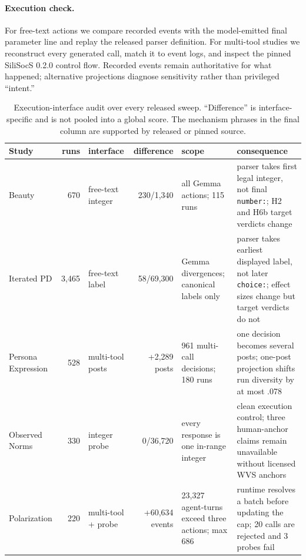 \documentclass[9pt,twocolumn]{extarticle}
\begin{document}
\paragraph{Execution check.}
For free-text actions we compare recorded events with the model-emitted final parameter line and replay the released parser definition. For multi-tool studies we reconstruct every generated call, match it to event logs, and inspect the pinned SiliSocS 0.2.0 control flow. Recorded events remain authoritative for what happened; alternative projections diagnose sensitivity rather than privileged ``intent.''

\begin{table}[t]
\centering
\scriptsize
\caption{Execution-interface audit over every released sweep. ``Difference'' is interface-specific and is not pooled into a global score. The mechanism phrases in the final column are supported by released or pinned source.}
\label{tab:interfaces}
\begin{tabular}{@{}lrlr p{3.45cm} p{5.45cm}@{}}
\toprule
Study & runs & interface & difference & scope & consequence \\
\midrule
Beauty & 670 & free-text integer & 230/1,340 & all Gemma actions; 115 runs & parser takes first legal integer, not final \texttt{number:}; H2 and H6b target verdicts change \\
Iterated PD & 3,465 & free-text label & 58/69,300 & Gemma divergences; canonical labels only & parser takes earliest displayed label, not later \texttt{choice:}; effect sizes change but target verdicts do not \\
Persona Expression & 528 & multi-tool posts & +2,289 posts & 961 multi-call decisions; 180 runs & one decision becomes several posts; one-post projection shifts run diversity by at most .078 \\
Observed Norms & 330 & integer probe & 0/36,720 & every response is one in-range integer & clean execution control; three human-anchor claims remain unavailable without licensed WVS anchors \\
Polarization & 220 & multi-tool + probe & +60,634 events & 23,327 agent-turns exceed three actions; max 686 & runtime resolves a batch before updating the cap; 20 calls are rejected and 3 probes fail \\
\bottomrule
\end{tabular}
\vspace{-0.65em}
\end{table}
\end{document}
